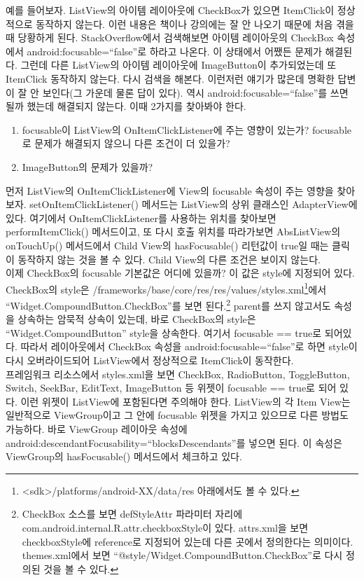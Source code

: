 예를 들어보자.
ListView의 아이템 레이아웃에 CheckBox가 있으면 ItemClick이 정상적으로 동작하지 않는다. 이런 내용은 책이나 강의에는 잘 안 나오기 때문에 처음 겪을 때 당황하게 된다. 
StackOverflow에서 검색해보면 아이템 레이아웃의 CheckBox 속성에서 android:focusable=``false''로 하라고 나온다. 이 상태에서 어쨌든 문제가 해결된다.
그런데 다른 ListView의 아이템 레이아웃에 ImageButton이 추가되었는데 또 ItemClick 동작하지 않는다. 다시 검색을 해본다. 이런저런 얘기가 많은데 명확한 답변이 잘 안 보인다(그 가운데 물론 답이 있다). 역시 android:focusable=``false''를 쓰면 될까 했는데 해결되지 않는다. 이때 2가지를 찾아봐야 한다. 
\begin{enumerate}
\item focusable이 ListView의 OnItemClickListener에 주는 영향이 있는가? focusable로 문제가 해결되지 않으니 다른 조건이 더 있을가?
\item ImageButton의 문제가 있을까?
\end{enumerate}

먼저 ListView의 OnItemClickListener에 View의 focusable 속성이 주는 영향을 찾아보자. setOnItemClickListener() 메서드는 ListView의 상위 클래스인 AdapterView에 있다. 
여기에서 OnItemClickListener를 사용하는 위치를 찾아보면 performItemClick() 메서드이고, 또 다시 호출 위치를 따라가보면 AbsListView의 onTouchUp() 메서드에서 Child View의 hasFocusable() 리턴값이 true일 때는 클릭이 동작하지 않는 것을 볼 수 있다. Child View의 다른 조건은 보이지 않는다.\\

이제 CheckBox의 focusable 기본값은 어디에 있을까? 이 값은 style에 지정되어 있다.
CheckBox의 style은 /frameworks/base/core/res/res/values/styles.xml\footnote{<sdk>/platforms/android-XX/data/res 아래에서도 볼 수 있다.}에서 ``Widget.CompoundButton.CheckBox''를 보면 된다.\footnote{CheckBox 소스를 보면 defStyleAttr 파라미터 자리에 com.android.internal.R.attr.checkboxStyle이 있다. attrs.xml을 보면 checkboxStyle에 reference로 지정되어 있는데 다른 곳에서 정의한다는 의미이다. themes.xml에서 보면 ``@style/Widget.CompoundButton.CheckBox''로 다시 정의된 것을 볼 수 있다.}
parent를 쓰지 않고서도 속성을 상속하는 암묵적 상속이 있는데, 바로 CheckBox의 style은 ``Widget.CompoundButton'' style을 상속한다. 여기서 focusable == true로 되어있다.
따라서 레이아웃에서 CheckBox 속성을 android:focusable=``false''로 하면 style이 다시 오버라이드되어 ListView에서 정상적으로 ItemClick이 동작한다.\\

프레임워크 리소스에서 styles.xml을 보면 CheckBox, RadioButton, ToggleButton, Switch, SeekBar, EditText, ImageButton 등 위젯이 focusable == true로 되어 있다. 이런 위젯이 ListView에 포함된다면 주의해야 한다.
ListView의 각 Item View는 일반적으로 ViewGroup이고 그 안에 focusable 위젯을 가지고 있으므로 다른 방법도 가능하다. 바로 ViewGroup 레이아웃 속성에 android:descendantFocusability=``blocksDescendants''를 넣으면 된다. 이 속성은 ViewGroup의 hasFocusable() 메서드에서 체크하고 있다.\\

